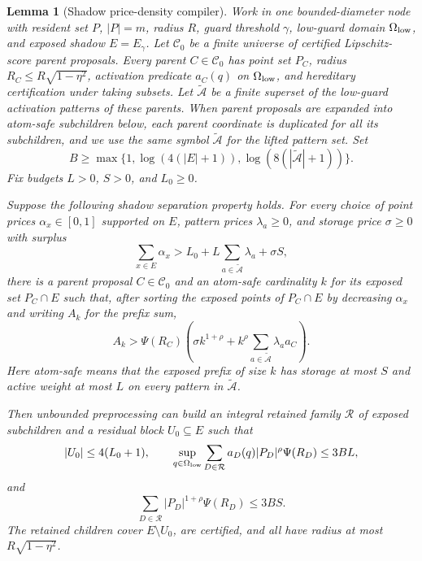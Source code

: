 \documentclass[10pt]{article}
\newtheorem{lemma}[theorem]{Lemma}
\theoremstyle{definition}
\begin{document}
\begin{lemma}[Shadow price-density compiler]\label{lem:shadow-price-density-compiler}
   Work in one bounded-diameter node with resident set $P$, $|P|=m$, radius
   $R$, guard threshold $\gamma$, low-guard domain $\Omega_{\rm low}$, and
   exposed shadow $E=E_\gamma$.  Let $\mathcal C_0$ be a finite universe of
   certified Lipschitz-score parent proposals.  Every parent $C\in\mathcal C_0$
   has point set $P_C$, radius $R_C\le R\sqrt{1-\eta^2}$, activation predicate
   $a_C(q)$ on $\Omega_{\rm low}$, and hereditary certification under taking
   subsets.  Let $\widetilde{\mathcal A}$ be a finite superset of the
   low-guard activation patterns of these parents.  When parent proposals are
   expanded into atom-safe subchildren below, each parent coordinate is
   duplicated for all its subchildren, and we use the same symbol
   $\widetilde{\mathcal A}$ for the lifted pattern set.  Set
   \[
      B\ge
      \max\{1,\log(4(|E|+1)),\log(8(|\widetilde{\mathcal A}|+1))\}.
   \]
   Fix budgets $L>0$, $S>0$, and $L_0\ge0$.

   Suppose the following shadow separation property holds.  For every choice
   of point prices $\alpha_x\in[0,1]$ supported on $E$, pattern prices
   $\lambda_a\ge0$, and storage price $\sigma\ge0$ with surplus
   \[
      \sum_{x\in E}\alpha_x
      >
      L_0+L\sum_{a\in\widetilde{\mathcal A}}\lambda_a+\sigma S,
      \tag{S1}
   \]
   there is a parent proposal $C\in\mathcal C_0$ and an atom-safe cardinality
   $k$ for its exposed set $P_C\cap E$ such that, after sorting the exposed
   points of $P_C\cap E$ by decreasing $\alpha_x$ and writing
   $A_k$ for the prefix sum,
   \[
      A_k>
      \Psi(R_C)
      \left(
         \sigma k^{1+\rho}
         +
         k^\rho
         \sum_{a\in\widetilde{\mathcal A}}\lambda_a a_C
      \right).
      \tag{S2}
   \]
   Here atom-safe means that the exposed prefix of size $k$ has storage at most
   $S$ and active weight at most $L$ on every pattern in
   $\widetilde{\mathcal A}$.

   Then unbounded preprocessing can build an integral retained family
   $\mathcal R$ of exposed subchildren and a residual block $U_0\subseteq E$
   such that
   \[
      |U_0|\le4(L_0+1),
      \qquad
      \sup_{q\in\Omega_{\rm low}}
      \sum_{D\in\mathcal R}a_D(q)|P_D|^\rho\Psi(R_D)
      \le3BL,
   \]
   and
   \[
      \sum_{D\in\mathcal R}|P_D|^{1+\rho}\Psi(R_D)\le3BS .
   \]
   The retained children cover $E\setminus U_0$, are certified, and all have
   radius at most $R\sqrt{1-\eta^2}$.
\end{lemma}
\end{document}
